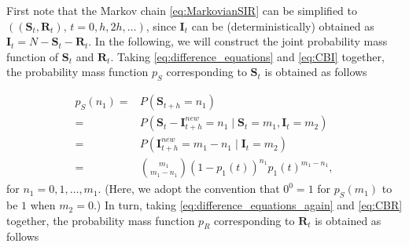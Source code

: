 \documentclass[a4paper,preprint]{elsarticle}
\renewcommand{\vec}[1]{\boldsymbol{#1}}
\begin{document}
First note that the Markov chain \eqref{eq:MarkovianSIR} can be simplified to $((\vec{S}_{t}, \vec{R}_{t}) \mbox{, }t=0,h,2h,\ldots)$, since $\vec{I}_{t}$ can be (deterministically) obtained as $\vec{I}_{t}=N-\vec{S}_{t}-\vec{R}_{t}$. In the following, we will construct the joint probability mass function of $\vec{S}_{t}$ and $\vec{R}_{t}$. Taking \eqref{eq:difference_equations} and \eqref{eq:CBI} together, the probability mass function  $p_S$ corresponding to $\vec{S}_{t}$ is obtained as follows

\begin{equation}
\begin{split}
\label{eq:Spmf}
p_S(n_1)=&P(\vec{S}_{t+h}=n_1)\\
={} & P(\vec{S}_{t}-\vec{I}_{t+h}^{new}=n_1\mid \vec{S}_{t}=m_1,\vec{I}_{t}=m_2) \\
={} & P(\vec{I}_{t+h}^{new}=m_1-n_1\mid \vec{I}_{t}=m_2) \\
={} & {\binom{m_1}{m_1-n_1}}(1-p_1(t))^{n_1}p_1(t)^{m_1-n_1},       
\end{split}
\end{equation}
%
for $n_1=0,1,\ldots,m_1$. (Here, we adopt the convention that $0^0 = 1$ for $p_S(m_1)$ to be $1$ when $m_2 = 0$.) In turn, taking \eqref{eq:difference_equations_again} and \eqref{eq:CBR} together, the probability mass function  $p_R$ corresponding to $\vec{R}_{t}$ is obtained as follows 
\end{document}
